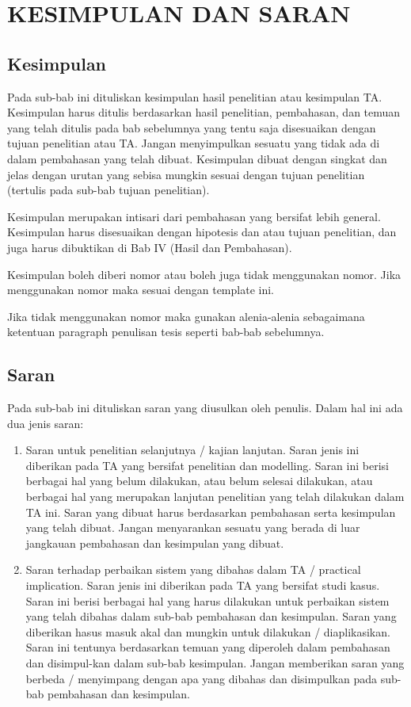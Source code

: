 	\chapter{\uppercase{kesimpulan dan saran}} \label{bab5}
\section{Kesimpulan} \label{kesimpulan}
Pada sub-bab ini dituliskan kesimpulan hasil penelitian atau kesimpulan TA. Kesimpulan harus ditulis berdasarkan hasil penelitian, pembahasan, dan temuan yang telah ditulis pada bab sebelumnya yang tentu saja disesuaikan dengan tujuan penelitian atau TA. Jangan menyimpulkan sesuatu yang tidak ada di dalam pembahasan yang telah dibuat. Kesimpulan dibuat dengan singkat dan jelas dengan urutan yang sebisa mungkin sesuai dengan tujuan penelitian (tertulis pada sub-bab tujuan penelitian).

Kesimpulan merupakan intisari dari pembahasan yang bersifat lebih general. Kesimpulan harus disesuaikan dengan hipotesis dan atau tujuan penelitian, dan juga harus dibuktikan di Bab IV (Hasil dan Pembahasan).

Kesimpulan boleh diberi nomor atau boleh juga tidak menggunakan nomor. Jika menggunakan nomor maka sesuai dengan template ini.

Jika tidak menggunakan nomor maka gunakan alenia-alenia sebagaimana ketentuan paragraph penulisan tesis seperti bab-bab sebelumnya.

\section{Saran} \label{saran}
Pada sub-bab ini dituliskan saran yang diusulkan oleh penulis. Dalam hal ini ada dua jenis saran:
\begin{enumerate}
	\item Saran untuk penelitian selanjutnya / kajian lanjutan. Saran jenis ini diberikan pada TA yang bersifat penelitian dan modelling. Saran ini berisi berbagai hal yang belum dilakukan, atau belum selesai dilakukan, atau berbagai hal yang merupakan lanjutan penelitian yang telah dilakukan dalam TA ini. Saran yang dibuat harus berdasarkan pembahasan serta kesimpulan yang telah dibuat. Jangan menyarankan sesuatu yang berada di luar jangkauan pembahasan dan kesimpulan yang dibuat.
	\item Saran terhadap perbaikan sistem yang dibahas dalam TA / practical implication. Saran jenis ini diberikan pada TA yang bersifat studi kasus. Saran ini berisi berbagai hal yang harus dilakukan untuk perbaikan sistem yang telah dibahas dalam sub-bab pembahasan dan kesimpulan. Saran yang diberikan hasus masuk akal dan mungkin untuk dilakukan / diaplikasikan. Saran ini tentunya berdasarkan temuan yang diperoleh dalam pembahasan dan disimpul-kan dalam sub-bab kesimpulan. Jangan memberikan saran yang berbeda / menyimpang dengan apa yang dibahas dan disimpulkan pada sub-bab pembahasan dan kesimpulan.
\end{enumerate}